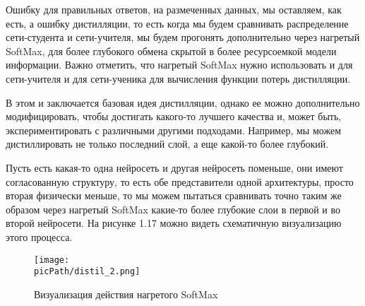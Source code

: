 \documentclass[oneside,final,12pt]{extreport}
\newcommand{\picPath}{images}
\begin{document}
Ошибку для правильных ответов, на размеченных данных, мы оставляем, как есть, а ошибку дистилляции, то есть когда мы будем сравнивать распределение сети-студента и сети-учителя, мы будем прогонять дополнительно через нагретый SoftMax, для более глубокого обмена скрытой в более ресурсоемкой модели информации. Важно отметить, что нагретый SoftMax нужно использовать и для сети-учителя и для сети-ученика для вычисления функции потерь дистилляции.

В этом и заключается базовая идея дистилляции, однако ее можно дополнительно модифицировать, чтобы достигать какого-то лучшего качества и, может быть, экспериментировать с различными другими подходами. Например, мы можем дистиллировать не только последний слой, а еще какой-то более глубокий. 

Пусть есть какая-то одна нейросеть и другая нейросеть поменьше, они имеют согласованную структуру, то есть обе представители одной архитектуры, просто вторая физически меньше, то мы можем пытаться сравнивать точно таким же образом через нагретый SoftMax какие-то более глубокие слои в первой и во второй нейросети. На рисунке 1.17 можно видеть схематичную визуализацию этого процесса.

\begin{figure}[H]
\begin{center}
  \texttt{[image: \\picPath/distil\_2.png]}
  \caption{Визуализация действия нагретого SoftMax}
  \label{fig:distil_2}
  \end{center}
\end{figure}
\end{document}
